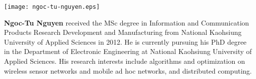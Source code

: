 \vspace{1cm}
\begin{flushleft}
\centering
\begin{minipage}{.15\textwidth}
{\texttt{[image: ngoc-tu-nguyen.eps]}}
\end{minipage}
\hspace{1cm}
\begin{minipage}{.75\textwidth}
\textbf{Ngoc-Tu Nguyen} received the MSc degree in Information and Communication
Products Research Development and Manufacturing from National
Kaohsiung University of Applied Sciences in 2012. He is currently
pursuing his PhD degree in the Department of Electronic Engineering
at National Kaohsiung University of Applied Sciences. His research
interests include algorithms and optimization on wireless sensor
networks and mobile ad hoc networks, and distributed computing.
\end{minipage}
\end{flushleft} 